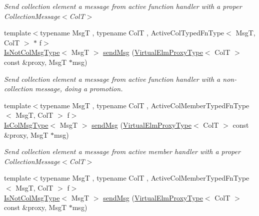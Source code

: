 \begin{DoxyCompactItemize}
\begin{DoxyCompactList}\small\item\em Send collection element a message from active function handler with a proper {\ttfamily Collection\+Message$<$\+Col\+T$>$} \end{DoxyCompactList}\item 
{\footnotesize template$<$typename MsgT , typename ColT , Active\+Col\+Typed\+Fn\+Type$<$ Msg\+T, Col\+T $>$ $\ast$ f$>$ }\\\hyperlink{structvt_1_1vrt_1_1collection_1_1_collection_manager_ae376deeefd4f89a0b1c93849977715d9}{Is\+Not\+Col\+Msg\+Type}$<$ MsgT $>$ \hyperlink{structvt_1_1vrt_1_1collection_1_1_collection_manager_a4f87f7f738cde8d48c9c18d16cc06166}{send\+Msg} (\hyperlink{namespacevt_1_1vrt_a620a5c8c59d13e513f690c74b4af516f}{Virtual\+Elm\+Proxy\+Type}$<$ ColT $>$ const \&proxy, MsgT $\ast$msg)
\begin{DoxyCompactList}\small\item\em Send collection element a message from active function handler with a non-\/collection message, doing a promotion. \end{DoxyCompactList}\item 
{\footnotesize template$<$typename MsgT , typename ColT , Active\+Col\+Member\+Typed\+Fn\+Type$<$ Msg\+T, Col\+T $>$ f$>$ }\\\hyperlink{structvt_1_1vrt_1_1collection_1_1_collection_manager_a21c21612c806016788057aeab142af20}{Is\+Col\+Msg\+Type}$<$ MsgT $>$ \hyperlink{structvt_1_1vrt_1_1collection_1_1_collection_manager_a3ea2d130487c02b8dbda05b7befda88d}{send\+Msg} (\hyperlink{namespacevt_1_1vrt_a620a5c8c59d13e513f690c74b4af516f}{Virtual\+Elm\+Proxy\+Type}$<$ ColT $>$ const \&proxy, MsgT $\ast$msg)
\begin{DoxyCompactList}\small\item\em Send collection element a message from active member handler with a proper {\ttfamily Collection\+Message$<$\+Col\+T$>$} \end{DoxyCompactList}\item 
{\footnotesize template$<$typename MsgT , typename ColT , Active\+Col\+Member\+Typed\+Fn\+Type$<$ Msg\+T, Col\+T $>$ f$>$ }\\\hyperlink{structvt_1_1vrt_1_1collection_1_1_collection_manager_ae376deeefd4f89a0b1c93849977715d9}{Is\+Not\+Col\+Msg\+Type}$<$ MsgT $>$ \hyperlink{structvt_1_1vrt_1_1collection_1_1_collection_manager_a229f96a5075562ee92743d69fc285254}{send\+Msg} (\hyperlink{namespacevt_1_1vrt_a620a5c8c59d13e513f690c74b4af516f}{Virtual\+Elm\+Proxy\+Type}$<$ ColT $>$ const \&proxy, MsgT $\ast$msg)

\end{DoxyCompactItemize}
